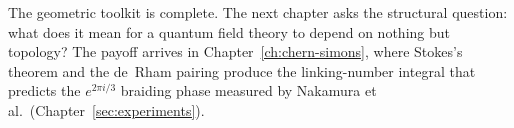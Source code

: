 \medskip

\noindent The geometric toolkit is complete.  The next chapter asks the structural question: what does it mean for a quantum field theory to depend on nothing but topology?  The payoff arrives in Chapter~\ref{ch:chern-simons}, where Stokes's theorem and the de~Rham pairing produce the linking-number integral that predicts the $e^{2\pi i/3}$ braiding phase measured by Nakamura et al.\ (Chapter~\ref{sec:experiments}).

